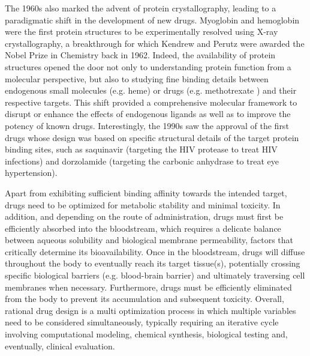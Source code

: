 The 1960s also marked the advent of protein crystallography, leading to a paradigmatic shift in the development of new drugs. Myoglobin and hemoglobin were the first protein structures to be experimentally resolved using X-ray crystallography, a breakthrough for which Kendrew and Perutz were awarded the Nobel Prize in Chemistry back in 1962\cite{kendrew_three-dimensional_1958, muirhead_structure_1963}. Indeed, the availability of protein structures opened the door not only to understanding protein function from a molecular perspective, but also to studying fine binding details between endogenous small molecules (e.g. heme\cite{kendrew_three-dimensional_1958, muirhead_structure_1963}) or drugs (e.g. methotrexate \cite{bolin_crystal_1982}) and their respective targets. This shift provided a comprehensive molecular framework to disrupt or enhance the effects of endogenous ligands as well as to improve the potency of known drugs. Interestingly, the 1990s saw the approval of the first drugs whose design was based on specific structural details of the target protein binding sites, such as saquinavir (targeting the HIV protease to treat HIV infections) and dorzolamide (targeting the carbonic anhydrase to treat eye hypertension)\cite{rondeau_protein_2008, leelananda_computational_2016}. 

Apart from exhibiting sufficient binding affinity towards the intended target, drugs need to be optimized for metabolic stability and minimal toxicity. In addition, and depending on the route of administration, drugs must first be efficiently absorbed into the bloodstream, which requires a delicate balance between aqueous solubility and biological membrane permeability, factors that critically determine its bioavailability. Once in the bloodstream, drugs will diffuse throughout the body to eventually reach its target tissue(s), potentially crossing specific biological barriers (e.g. blood-brain barrier) and ultimately traversing cell membranes when necessary. Furthermore, drugs must be efficiently eliminated from the body to prevent its accumulation and subsequent toxicity. Overall, rational drug design is a multi optimization process in which multiple variables need to be considered simultaneously, typically requiring an iterative cycle involving computational modeling, chemical synthesis, biological testing and, eventually, clinical evaluation\cite{waring_analysis_2015, patrick_introduction_2023}. 

